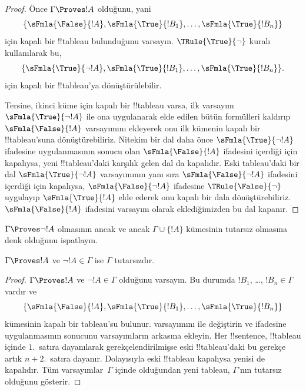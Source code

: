 \begin{proof}
Önce $\Gamma \Proves !A$ olduğunu, yani
\[
\{\sFmla{\False}{!A},
\sFmla{\True}{!B_1}, \dots, \sFmla{\True}{!B_n}\}
\]
için kapalı bir !!{tableau} bulunduğunu varsayın. $\TRule{\True}{\lnot}$
kuralı kullanılarak bu,
\[
\{\sFmla{\True}{\lnot !A},
\sFmla{\True}{!B_1}, \dots, \sFmla{\True}{!B_n}\}.
\]
için kapalı bir !!{tableau}'ya dönüştürülebilir.

Tersine, ikinci küme için kapalı bir !!{tableau} varsa, ilk
varsayım~$\sFmla{\True}{\lnot !A}$ ile ona
\TRule{\True}{\lnot} uygulanarak elde edilen bütün formülleri kaldırıp
$\sFmla{\False}{!A}$ varsayımını ekleyerek onu ilk kümenin kapalı bir
!!{tableau}'suna dönüştürebiliriz. Nitekim bir dal daha önce
$\sFmla{\True}{\lnot !A}$ ifadesine \TRule{\True}{\lnot} uygulanmasının
sonucu olan $\sFmla{\False}{!A}$ ifadesini içerdiği için kapalıysa, yeni
!!{tableau}'daki karşılık gelen dal da kapalıdır. Eski tableau'daki bir dal
$\sFmla{\True}{\lnot !A}$ varsayımının yanı sıra
$\sFmla{\False}{\lnot !A}$ ifadesini içerdiği için kapalıysa,
$\sFmla{\False}{\lnot !A}$ ifadesine $\TRule{\False}{\lnot}$ uygulayıp
$\sFmla{\True}{!A}$ elde ederek onu kapalı bir dala dönüştürebiliriz.
$\sFmla{\False}{!A}$ ifadesini varsayım olarak eklediğimizden bu dal
kapanır.
\end{proof}

\begin{prob}
$\Gamma \Proves \lnot !A$ olmasının ancak ve ancak
$\Gamma \cup \{!A\}$ kümesinin tutarsız olmasına denk olduğunu ispatlayın.
\end{prob}

\begin{prop}
  $\Gamma \Proves !A$ ve $\lnot !A \in \Gamma$ ise $\Gamma$ tutarsızdır.
\end{prop}

\begin{proof}
  $\Gamma \Proves !A$ ve $\lnot !A \in \Gamma$ olduğunu varsayın. Bu
  durumda $!B_1$, \dots, $!B_n \in \Gamma$ vardır ve
  \[
  \{\sFmla{\False}{!A}, \sFmla{\True}{!B_1}, \dots, \sFmla{\True}{!B_n}\}
  \]
  kümesinin kapalı bir tableau'su bulunur.  varsayımını
   ile değiştirin ve
   ifadesine \TRule{\True}{\lnot} uygulanmasının
  sonucunu varsayımların arkasına ekleyin. Her !!{sentence}, !!{tableau}
  içinde $1$.~satıra dayanılarak gerekçelendirilmişse eski !!{tableau}'daki
  bu gerekçe artık $n+2$.~satıra dayanır. Dolayısıyla eski !!{tableau}
  kapalıysa yenisi de kapalıdır. Tüm varsayımlar~$\Gamma$ içinde olduğundan
  yeni tableau, $\Gamma$'nın tutarsız olduğunu gösterir.
\end{proof}

